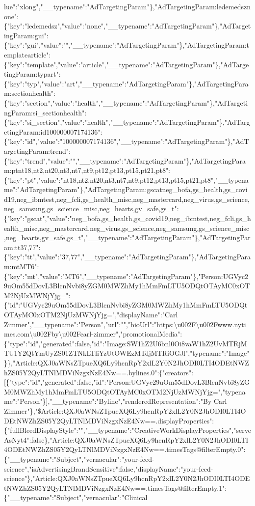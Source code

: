 lue":"xlong","\_\_typename":"AdTargetingParam"\},"AdTargetingParam:ledemedsznone":\{"key":"ledemedsz","value":"none","\_\_typename":"AdTargetingParam"\},"AdTargetingParam:gui":\{"key":"gui","value":"","\_\_typename":"AdTargetingParam"\},"AdTargetingParam:templatearticle":\{"key":"template","value":"article","\_\_typename":"AdTargetingParam"\},"AdTargetingParam:typart":\{"key":"typ","value":"art","\_\_typename":"AdTargetingParam"\},"AdTargetingParam:sectionhealth":\{"key":"section","value":"health","\_\_typename":"AdTargetingParam"\},"AdTargetingParam:si\_sectionhealth":\{"key":"si\_section","value":"health","\_\_typename":"AdTargetingParam"\},"AdTargetingParam:id100000007174136":\{"key":"id","value":"100000007174136","\_\_typename":"AdTargetingParam"\},"AdTargetingParam:trend":\{"key":"trend","value":"","\_\_typename":"AdTargetingParam"\},"AdTargetingParam:ptnt18,nt2,nt20,nt3,nt7,nt9,pt12,pt13,pt15,pt21,pt8":\{"key":"pt","value":"nt18,nt2,nt20,nt3,nt7,nt9,pt12,pt13,pt15,pt21,pt8","\_\_typename":"AdTargetingParam"\},"AdTargetingParam:gscatneg\_bofa,gs\_health,gs\_covid19,neg\_ibmtest,neg\_fcli,gs\_health\_misc,neg\_mastercard,neg\_virus,gs\_science,neg\_samsung,gs\_science\_misc,neg\_hearts,gv\_safe,gs\_t":\{"key":"gscat","value":"neg\_bofa,gs\_health,gs\_covid19,neg\_ibmtest,neg\_fcli,gs\_health\_misc,neg\_mastercard,neg\_virus,gs\_science,neg\_samsung,gs\_science\_misc,neg\_hearts,gv\_safe,gs\_t","\_\_typename":"AdTargetingParam"\},"AdTargetingParam:tt37,77":\{"key":"tt","value":"37,77","\_\_typename":"AdTargetingParam"\},"AdTargetingParam:mtMT6":\{"key":"mt","value":"MT6","\_\_typename":"AdTargetingParam"\},"Person:UGVyc29uOm55dDovL3BlcnNvbi8yZGM0MWZhMy1hMmFmLTU5ODQtOTAyMC0xOTM2NjUzMWNjYjg=":\{"id":"UGVyc29uOm55dDovL3BlcnNvbi8yZGM0MWZhMy1hMmFmLTU5ODQtOTAyMC0xOTM2NjUzMWNjYjg=","displayName":"Carl
Zimmer","\_\_typename":"Person","url":"","bioUrl":"https:\textbackslash{}u002F\textbackslash{}u002Fwww.nytimes.com\textbackslash{}u002Fby\textbackslash{}u002Fcarl-zimmer","promotionalMedia":\{"type":"id","generated":false,"id":"Image:SW1hZ2U6bnl0Oi8vaW1hZ2UvMTRjMTU1Y2QtYmUyZS01ZTNkLTliYzUtOWEzMTdjMTRiOGJl","typename":"Image"\}\},"Article:QXJ0aWNsZTpueXQ6Ly9hcnRpY2xlL2Y0N2JhODI0LTI4ODEtNWZhZS05Y2QyLTNlMDViNzgxNzE4Nw==.bylines.0":\{"creators":{[}\{"type":"id","generated":false,"id":"Person:UGVyc29uOm55dDovL3BlcnNvbi8yZGM0MWZhMy1hMmFmLTU5ODQtOTAyMC0xOTM2NjUzMWNjYjg=","typename":"Person"\}{]},"\_\_typename":"Byline","renderedRepresentation":"By
Carl
Zimmer"\},"\$Article:QXJ0aWNsZTpueXQ6Ly9hcnRpY2xlL2Y0N2JhODI0LTI4ODEtNWZhZS05Y2QyLTNlMDViNzgxNzE4Nw==.displayProperties":\{"fullBleedDisplayStyle":"","\_\_typename":"CreativeWorkDisplayProperties","serveAsNyt4":false\},"Article:QXJ0aWNsZTpueXQ6Ly9hcnRpY2xlL2Y0N2JhODI0LTI4ODEtNWZhZS05Y2QyLTNlMDViNzgxNzE4Nw==.timesTags@filterEmpty.0":\{"\_\_typename":"Subject","vernacular":"your-feed-science","isAdvertisingBrandSensitive":false,"displayName":"your-feed-science"\},"Article:QXJ0aWNsZTpueXQ6Ly9hcnRpY2xlL2Y0N2JhODI0LTI4ODEtNWZhZS05Y2QyLTNlMDViNzgxNzE4Nw==.timesTags@filterEmpty.1":\{"\_\_typename":"Subject","vernacular":"Clinical
